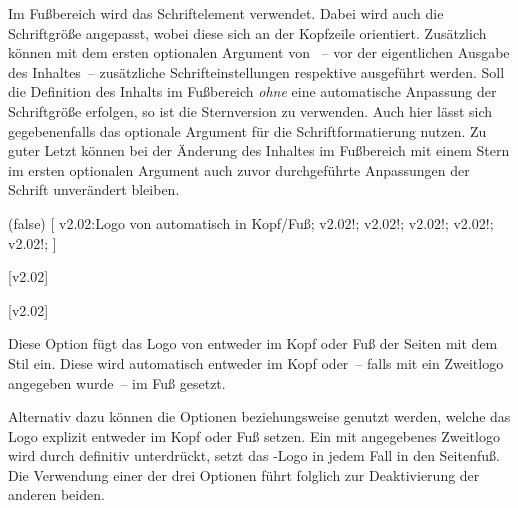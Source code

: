 \begin{DeclareEntity*}{}
\begin{DeclareEntity*}{}
\begin{DeclareEntity*}{}
\begin{Declaration}
\begin{Declaration}
%
Im Fußbereich wird das Schriftelement  verwendet. Dabei wird 
auch die Schriftgröße angepasst, wobei diese sich an der Kopfzeile orientiert. 
Zusätzlich können mit dem ersten optionalen Argument von ~-- 
vor der eigentlichen Ausgabe des Inhaltes~-- zusätzliche Schrifteinstellungen 
respektive  ausgeführt werden. Soll die Definition des 
Inhalts im Fußbereich \emph{ohne} eine automatische Anpassung der Schriftgröße 
erfolgen, so ist die Sternversion  zu verwenden. Auch hier 
lässt sich gegebenenfalls das optionale Argument für die Schriftformatierung 
nutzen.
%
Zu guter Letzt können bei der Änderung des Inhaltes im Fußbereich mit einem 
Stern im ersten optionalen Argument 
 auch zuvor 
durchgeführte Anpassungen der Schrift unverändert bleiben.
\end{Declaration}
\end{Declaration}

\begin{Declaration}
  {}
  (false)
[%
  v2.02:Logo von \DDC automatisch in Kopf/Fuß;%
  v2.02!;
  v2.02!;
  v2.02!;
  v2.02!;
  v2.02!;
]
\begin{Declaration}
  {}
  [v2.02]
\begin{Declaration}
  {}
  [v2.02]

Diese Option fügt das Logo von \DDC entweder im Kopf oder Fuß der Seiten mit 
dem Stil  ein. Diese wird automatisch entweder im Kopf 
oder~-- falls mit  ein Zweitlogo angegeben wurde~-- im Fuß 
gesetzt.

Alternativ dazu können die Optionen  beziehungsweise 
 genutzt werden, welche das Logo explizit entweder im Kopf oder 
Fuß setzen. Ein mit  angegebenes Zweitlogo wird durch 
 definitiv unterdrückt,  setzt 
das \DDC-Logo in jedem Fall in den Seitenfuß. Die Verwendung einer der drei 
Optionen führt folglich zur Deaktivierung der anderen beiden.


\end{Declaration}
\end{Declaration}
\end{Declaration}
\end{DeclareEntity*}
\end{DeclareEntity*}
\end{DeclareEntity*}
